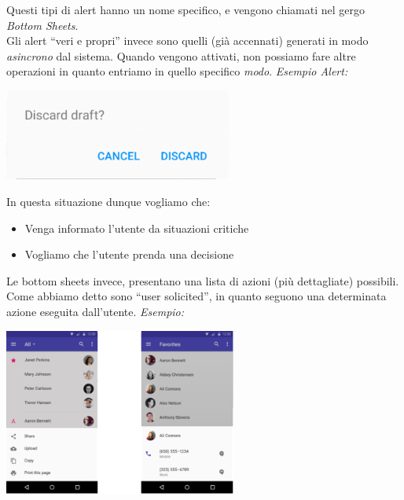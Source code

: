 \documentclass[oneside]{book}
\begin{document}
				Questi tipi di alert hanno un nome specifico, e vengono chiamati nel gergo \emph{Bottom Sheets}. \\
				Gli alert ``veri e propri'' invece sono quelli (già accennati) generati in modo \emph{asincrono} dal sistema. Quando vengono attivati, non possiamo fare altre operazioni in quanto entriamo in quello specifico \emph{modo}. \emph{Esempio Alert:} 
				\begin{center}
				\includegraphics[height = 30mm]{images/alert.png}
				\end{center}
				In questa situazione dunque vogliamo che:
				\begin{itemize}
				\item Venga informato l'utente da situazioni critiche
				\item Vogliamo che l'utente prenda una decisione
				\end{itemize}
				Le bottom sheets invece, presentano una lista di azioni (più dettagliate) possibili. Come abbiamo detto sono ``user solicited'', in quanto seguono una determinata azione eseguita dall'utente. \emph{Esempio:}
				\begin{center}
				\includegraphics[height = 55mm]{images/bottomSheet.png}
				\end{center}  

	\newpage
\end{document}
